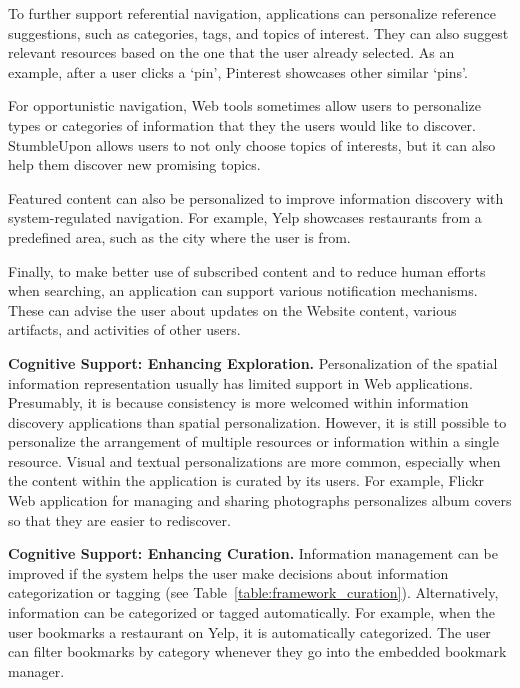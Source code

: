 \documentclass[review]{elsarticle}
\newcommand{\feature}[1]{{\ttfamily#1}}
\begin{document}
{{{To further support referential navigation, applications can \feature{personalize} reference suggestions, such as \feature{categories}, \feature{tags}, and \feature{topics} of interest. They can also suggest relevant resources based on the one that the user already selected. As an example, after a user clicks a `pin', Pinterest showcases other similar `pins'.

For opportunistic navigation, Web tools sometimes allow users to \feature{personalize} types or categories of information that they the users would like to discover. StumbleUpon allows users to not only choose topics of interests, but it can also help them discover new promising topics.


Featured content can also be \feature{personalized} to improve information discovery with system-regulated navigation. For example, Yelp showcases restaurants from a predefined area, such as the city where the user is from.

Finally, to make better use of subscribed content and to reduce human efforts when searching, an application can support various \feature{notification mechanisms}. These can advise the user about updates on the \feature{Website content}, various \feature{artifacts}, and activities of other \feature{users}.  

} %
{\textbf{Cognitive Support: Enhancing Exploration.}
\feature{Personalization} of the \feature{spatial} information representation usually has limited support in Web applications. Presumably, it is because consistency is more welcomed within information discovery applications than spatial personalization. However, it is still possible to personalize the arrangement of multiple resources or information within a single resource. 
%
\feature{Visual} and \feature{textual personalizations} are more common, especially when the content within the application is curated by its users.  For example, Flickr Web application for managing and sharing photographs personalizes album covers so that they are easier to rediscover. 


{\textbf{Cognitive Support: Enhancing Curation.}
Information management can be improved if the system helps the user make decisions about information categorization or tagging (see Table~\ref{table:framework_curation}). Alternatively, information can be \feature{categorized} or \feature{tagged automatically}. For example, when the user bookmarks a restaurant on Yelp, it is automatically categorized. The user can filter bookmarks by category whenever they go into the embedded bookmark manager. 

}}}}
\end{document}
